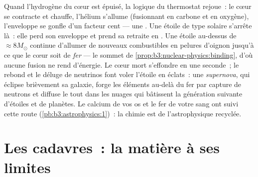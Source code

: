 \begin{remark}\label{rem:b3:astrophysics:evolution}
Quand l'hydrogène du cœur est épuisé, la logique du thermostat
rejoue~: le cœur se contracte et chauffe, l'hélium s'allume (fusionnant
en carbone et en oxygène), l'enveloppe se gonfle d'un facteur cent ---
une . Une étoile de type solaire s'arrête là~: elle
perd son enveloppe et prend sa retraite en . Une étoile
au-dessus de $\approx8M_\odot$ continue d'allumer de nouveaux
combustibles en pelures d'oignon jusqu'à ce que le cœur soit de
\emph{fer} --- le sommet de
\cref{prop:b3:nuclear-physics:binding}, d'où aucune fusion ne rend
d'énergie. Le cœur mort s'effondre en une seconde~; le rebond et le
déluge de neutrinos font voler l'étoile en éclats~: une
\emph{supernova}, qui éclipse brièvement sa galaxie, forge les
éléments au-delà du fer par capture de neutrons et diffuse le tout
dans les nuages qui bâtissent la génération suivante d'étoiles et de
planètes. Le calcium de vos os et le fer de votre sang ont suivi cette
route (\cref{pb:b3:astrophysics:1})~: la chimie est de
l'astrophysique recyclée.
\end{remark}

\section{Les cadavres~: la matière à ses limites}

